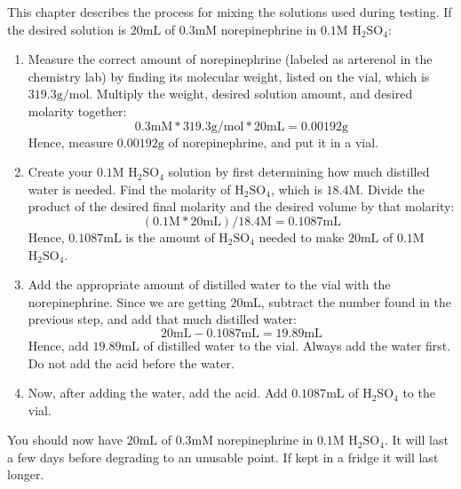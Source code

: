 This chapter describes the process for mixing the solutions used during testing. If the desired solution is $20 \mathrm{mL}$ of $0.3 \mathrm{mM}$ norepinephrine in $0.1 \mathrm{M}$ $\mathrm{H}_2 \mathrm{SO}_4$:
\begin{enumerate}
	\item Measure the correct amount of norepinephrine (labeled as arterenol in the chemistry lab) by finding its molecular weight, listed on the vial, which is $319.3 \mathrm{g/mol}$. Multiply the weight, desired solution amount, and desired molarity together:
		\begin{displaymath}
			0.3 \mathrm{mM} * 319.3 \mathrm{g/mol} * 20 \mathrm{mL} = 0.00192 \mathrm{g}
		\end{displaymath}
		Hence, measure $0.00192 \mathrm{g}$ of norepinephrine, and put it in a vial.
	\item Create your $0.1 \mathrm{M}$ $\mathrm{H}_2 \mathrm{SO}_4$ solution by first determining how much distilled water is needed. Find the molarity of $\mathrm{H}_2 \mathrm{SO}_4$, which is $18.4 \mathrm{M}$. Divide the product of the desired final molarity and the desired volume by that molarity:
		\begin{displaymath}
			(0.1 \mathrm{M} * 20 \mathrm{mL}) / 18.4 \mathrm{M} = 0.1087 \mathrm{mL}
		\end{displaymath}
		Hence, $0.1087 \mathrm{mL}$ is the amount of $\mathrm{H}_2 \mathrm{SO}_4$ needed to make $20 \mathrm{mL}$ of $0.1 \mathrm{M}$ $\mathrm{H}_2 \mathrm{SO}_4$.
	\item Add the appropriate amount of distilled water to the vial with the norepinephrine. Since we are getting $20 \mathrm{mL}$, subtract the number found in the previous step, and add that much distilled water:
		\begin{displaymath}
			20 \mathrm{mL} - 0.1087 \mathrm{mL} = 19.89 \mathrm{mL}
		\end{displaymath}
		Hence, add $19.89 \mathrm{mL}$ of distilled water to the vial. Always add the water first. Do not add the acid before the water.
	\item Now, after adding the water, add the acid. Add $0.1087 \mathrm{mL}$ of $\mathrm{H}_2 \mathrm{SO}_4$ to the vial.
\end{enumerate}

You should now have $20 \mathrm{mL}$ of $0.3 \mathrm{mM}$ norepinephrine in $0.1 \mathrm{M}$ $\mathrm{H}_2 \mathrm{SO}_4$. It will last a few days before degrading to an unusable point. If kept in a fridge it will last longer.
